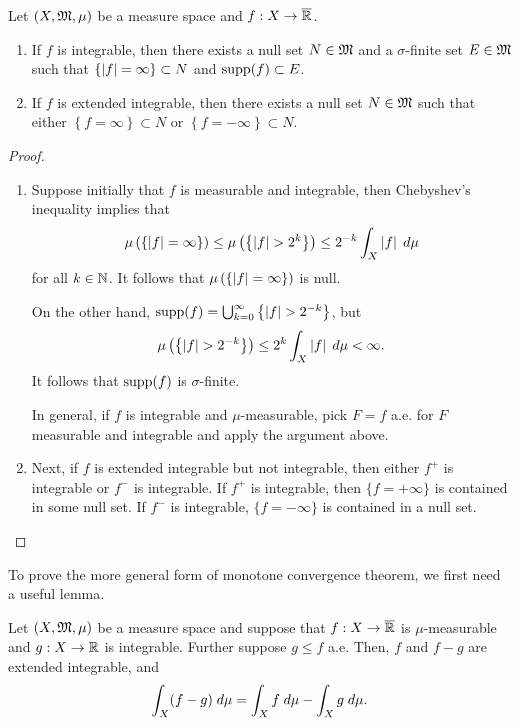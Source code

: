\documentclass[a4paper]{article}
\begin{document}
\begin{cor}
Let $(X, \mathfrak{M}, \mu)$ be a measure space and $f: X \to \overline{\mathbb{R}}$.
\begin{enumerate}
  \item If $f$ is integrable, then there exists 
  a null set $N \in \mathfrak{M}$ and a $\sigma$-finite set $E \in \mathfrak{M}$
  such that 
  $\left\{ \left\lvert f\right\rvert = \infty \right\} \subset N$ 
  and $\operatorname{supp}(f) \subset E$.

  \item If $f$ is extended integrable, then there 
  exists a null set $N \in \mathfrak{M}$ such that 
  either $\left\{ f = \infty \right\} \subset N$
  or $\left\{ f = -\infty \right\} \subset N$.
\end{enumerate}
\end{cor}

\begin{proof}
\begin{enumerate}
  \item Suppose initially that $f$ is measurable and integrable, 
  then Chebyshev's inequality implies that 
  \[
  \mu \left( \left\{ \left\lvert f\right\rvert = \infty \right\} \right) 
  \leq \mu \left( \left\{ \left\lvert f\right\rvert > 2^k \right\} \right) 
  \leq 2^{-k} \int_X \left\lvert f\right\rvert \; d \mu
  \]
  for all $k \in \mathbb{N}$. It follows that 
  $\mu \left( \left\{ \left\lvert f\right\rvert = \infty \right\} \right)$ 
  is null. 
  
  On the other hand, $\operatorname{supp}(f) = \bigcup_{k=0}^\infty \left\{ \left\lvert f\right\rvert 
  > 2^{-k} \right\}$, but 
  \[
  \mu \left( \left\{ \left\lvert f\right\rvert > 2^{-k} \right\} \right) 
  \leq 2^k \int_X \left\lvert f\right\rvert \; d \mu < \infty.
  \]
  It follows that $\operatorname{supp}(f)$ is $\sigma$-finite. 
  
  In general, if $f$ is integrable and $\mu$-measurable, 
  pick $F = f$ a.e. for $F$ measurable and integrable and 
  apply the argument above.

  \item Next, if $f$ is extended integrable but not integrable, 
  then either $f^+$ is integrable or $f^-$ is integrable.
  If $f^+$ is integrable, then $\{f = +\infty\}$ is 
  contained in some null set. If $f^-$ is integrable, 
  $\{f = -\infty\}$ is contained in a null set.
\end{enumerate}
\end{proof}

To prove the more general form of monotone convergence theorem,
we first need a useful lemma. 

\begin{lemma}
Let $(X, \mathfrak{M}, \mu)$ be a measure space and suppose that 
$f : X \to \overline{\mathbb{R}}$ is $\mu$-measurable and $g : X \to \mathbb{R}$
is integrable. Further suppose $g \leq f$ a.e. Then, $f$ 
and $f - g$ are extended integrable, and 
\[
\int_X (f - g) \; d \mu = \int_X f \; d \mu - \int_X g \; d \mu.
\]
\end{lemma}
\end{document}
